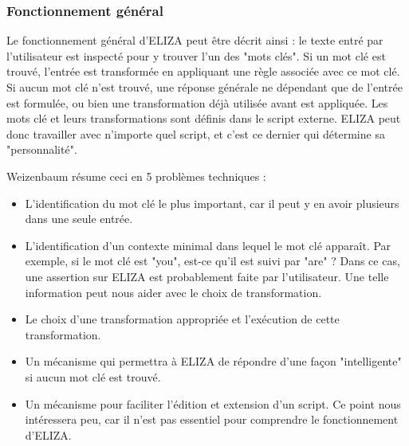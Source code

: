 \documentclass[11pt, a4paper]{report}
\begin{document}
      \subsubsection{Fonctionnement général}
Le fonctionnement général d'ELIZA peut être décrit ainsi : le texte entré par l'utilisateur 
est inspecté pour y trouver l'un des "mots clés". Si un mot clé est trouvé, l'entrée est transformée 
en appliquant une règle associée avec ce mot clé. Si aucun mot clé n'est trouvé, une réponse générale 
ne dépendant que de l'entrée est formulée, ou bien une transformation déjà utilisée avant est appliquée. 
Les mots clé et leurs transformations sont définis dans le script externe. ELIZA peut donc travailler 
avec n'importe quel script, et c'est ce dernier qui détermine sa "personnalité". 

Weizenbaum résume ceci en 5 problèmes techniques :
\begin{itemize}
  \item L'identification du mot clé le plus important, car il peut y en avoir plusieurs dans une 
  seule entrée.
  \item L'identification d'un contexte minimal dans lequel le mot clé apparaît. Par exemple, si le 
  mot clé est "you", est-ce qu'il est suivi par "are" ? Dans ce cas, une assertion sur ELIZA est 
  probablement faite par l'utilisateur. Une telle information peut nous aider avec le choix de transformation.
  \item Le choix d'une transformation appropriée et l'exécution de cette transformation. 
  \item Un mécanisme qui permettra à ELIZA de répondre d'une façon "intelligente" si aucun mot 
  clé est trouvé. 
  \item Un mécanisme pour faciliter l'édition et extension d'un script. Ce point nous intéressera peu, 
  car il n'est pas essentiel pour comprendre le fonctionnement d'ELIZA. 
\end{itemize}
\end{document}

